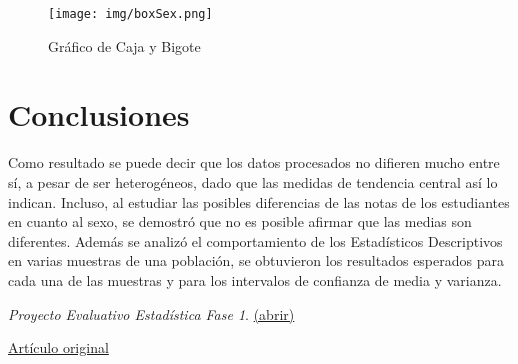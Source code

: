 \documentclass[a4paper,10pt,twocolumn]{article}
\begin{document}
		\begin{figure}[htb]%
		\begin{center}
			\hspace{-1.3cm}\texttt{[image: img/boxSex.png]}
		\end{center}
		\caption{Gráfico de Caja y Bigote \label{fig:box}}%
		\end{figure}

\section{Conclusiones}\label{sec:conc}

  Como resultado se puede decir que los datos procesados no difieren mucho entre sí, a pesar de ser heterogéneos, dado que las medidas de tendencia central así lo indican. Incluso, al estudiar las posibles diferencias de las notas de los estudiantes en cuanto al sexo, se demostró que no es posible afirmar que las medias son diferentes. Además se analizó el comportamiento de los Estadísticos Descriptivos en varias muestras de una población, se obtuvieron los resultados esperados para cada una de las muestras y para los intervalos de confianza de media y varianza.




\begin{thebibliography}{99}
	 \emph{Proyecto Evaluativo Estadística Fase 1}. \href{resources/orientacion.pdf}{(abrir)}

	 \href{../docs/student.pdf}{Artículo original}


\end{thebibliography}


\label{end}
\end{document}
